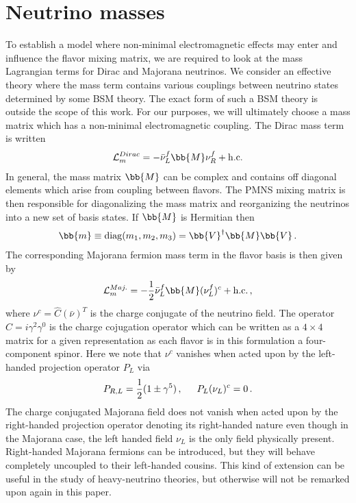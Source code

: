 \section{Neutrino masses}
\noindent To establish a model where non-minimal electromagnetic effects may enter and influence the flavor mixing matrix, we are required to look at the mass Lagrangian terms for Dirac and Majorana neutrinos. We consider an effective theory where the mass term contains various couplings between neutrino states determined by some BSM theory. The exact form of such a BSM theory is outside the scope of this work. For our purposes, we will ultimately choose a mass matrix which has a non-minimal electromagnetic coupling. The Dirac mass term is written
\begin{alignat}{1}
	\label{mass:eq:01} \mathcal{L}_{m}^{Dirac} = -\bar{\nu}^{f}_{L}\bb{M}\nu^{f}_{R}+\mathrm{h.c.}
\end{alignat}
In general, the mass matrix $\bb{M}$ can be complex and contains off diagonal elements which arise from coupling between flavors. The PMNS mixing matrix is then responsible for diagonalizing the mass matrix and reorganizing the neutrinos into a new set of basis states. If $\bb{M}$ is Hermitian then
\begin{alignat}{1}
	\label{mass:eq:02} \bb{m} \equiv \mathrm{diag}(m_{1}, m_{2}, m_{3}) = \bb{V}^{\dagger}\bb{M}\bb{V}\,.
\end{alignat}
The corresponding Majorana fermion mass term in the flavor basis is then given by
\begin{alignat}{1}
	\label{mass:eq:03} \mathcal{L}_{m}^{Maj.} = -\frac{1}{2}\bar{\nu}^{f}_{L}\bb{M}(\nu^{f}_{L})^{c}+\mathrm{h.c.}\,,
\end{alignat}
where $\nu^{c} = \hat{C}(\bar{\nu})^{T}$ is the charge conjugate of the neutrino field. The operator $\hat{C} = i\gamma^{2}\gamma^{0}$ is the charge cojugation operator which can be written as a $4\times4$ matrix for a given representation as each flavor is in this formulation a four-component spinor. Here we note that $\nu^{c}$ vanishes when acted upon by the left-handed projection operator $P_{L}$ via
\begin{alignat}{1}
	\label{mass:eq:04} P_{R,L} = \frac{1}{2}(1\pm\gamma^{5})\,,\indent P_{L}(\nu_{L})^{c}=0\,.
\end{alignat}
The charge conjugated Majorana field does not vanish when acted upon by the right-handed projection operator denoting its right-handed nature even though in the Majorana case, the left handed field $\nu_{L}$ is the only field physically present. Right-handed Majorana fermions can be introduced, but they will behave completely uncoupled to their left-handed cousins. This kind of extension can be useful in the study of heavy-neutrino theories, but otherwise will not be remarked upon again in this paper.
